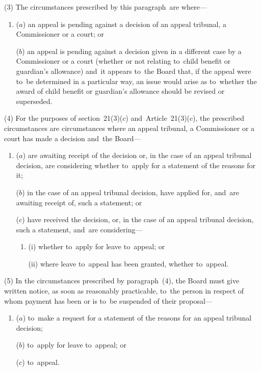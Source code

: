 \documentclass[12pt,a4paper]{article}
\begin{document}
(3) The circumstances prescribed by this paragraph~are where—
\begin{enumerate}\item[]
($a$) an appeal is pending against a decision of an appeal tribunal, a Commissioner or a court; or

($b$) an appeal is pending against a decision given in a different case by a Commissioner or a court (whether or not relating to~child benefit or guardian’s allowance) and~it appears to~the Board that, if the appeal were to~be determined in a particular way, an issue would arise as to~whether the award of child benefit or guardian’s allowance should be revised or superseded.
\end{enumerate}

(4) For the purposes of section~21(3)($c$)  and~Article~21(3)($c$), the prescribed circumstances are circumstances where an appeal tribunal, a Commissioner or a court has made a decision and~the Board—
\begin{enumerate}\item[]
($a$) are awaiting receipt of the decision or, in the case of an appeal tribunal decision, are considering whether to~apply for a statement of the reasons for it;

($b$) in the case of an appeal tribunal decision, have applied for, and~are awaiting receipt of, such a statement; or

($c$) have received the decision, or, in the case of an appeal tribunal decision, such a statement, and~are considering—
\begin{enumerate}\item[]
(i) whether to~apply for leave to~appeal; or

(ii) where leave to~appeal has been granted, whether to~appeal.
\end{enumerate}
\end{enumerate}

(5) In the circumstances prescribed by paragraph~(4), the Board must give written notice, as soon as reasonably practicable, to~the person in respect of whom payment has been or is to~be suspended of their proposal—
\begin{enumerate}\item[]
($a$) to~make a request for a statement of the reasons for an appeal tribunal decision;

($b$) to~apply for leave to~appeal; or

($c$) to~appeal.
\end{enumerate}
\end{document}
